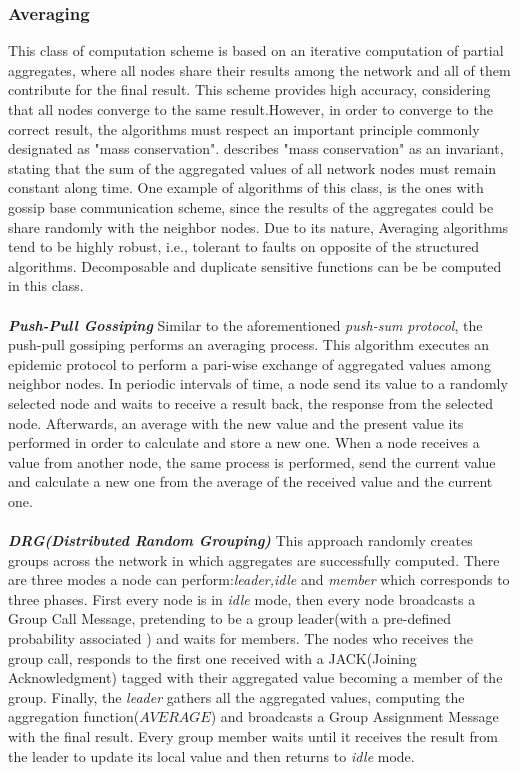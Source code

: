 \subsubsection{Averaging}
This class of computation scheme is based on an iterative computation of partial aggregates, where all nodes share their results among the network and all of them contribute for the final result. This scheme provides high accuracy, considering that all nodes converge to the same result.However, in order to converge to the correct result, the algorithms must respect an important principle commonly designated as "mass conservation". \cite{journals/corr/abs-1110-0725} describes "mass conservation" as an invariant, stating that the sum of the aggregated values of all network nodes must remain constant along time. One example of algorithms of this class, is the ones with gossip base communication scheme, since the results of the aggregates could be share randomly with the neighbor nodes. Due to its nature, Averaging algorithms tend to be highly robust, i.e., tolerant to faults on opposite of the structured algorithms. Decomposable and duplicate sensitive functions can be be computed in this class.\\
\\
\textbf{\textit{Push-Pull Gossiping}} Similar to the aforementioned \textit{push-sum protocol}, the push-pull gossiping\cite{jelasity2004epidemic} performs an averaging process. This algorithm executes an epidemic protocol to perform a pari-wise exchange of aggregated values among neighbor nodes\cite{journals/corr/abs-1110-0725}. In periodic intervals of time, a node send its value to a randomly selected node and waits to receive a result back, the response from the selected node. Afterwards, an average with the new value and the present value its performed in order to calculate and store a new one. When a node receives a value from another node, the same process is performed, send the current value and calculate a new one from the average of the received value and the current one.\\ 
\\
\textbf{\textit{DRG(Distributed Random Grouping)}} This approach \cite{chen2006robust} randomly creates groups across the network in which aggregates are successfully computed. There are three modes a node can perform:\textit{leader,idle} and \textit{member} which corresponds to three phases. First every node is in \textit{idle} mode, then every node broadcasts a Group Call Message, pretending to be a group leader(with a pre-defined probability associated ) and waits for members. The nodes who receives the group call, responds to the first one received with a JACK(Joining Acknowledgment) tagged with their aggregated value becoming a member of the group. Finally, the \textit{leader} gathers all the aggregated values, computing the aggregation function($AVERAGE$) and broadcasts a Group Assignment Message with the  final result. Every group member waits until it receives the result from the leader to update its local value and then returns to  \textit{idle} mode.\\
\\
